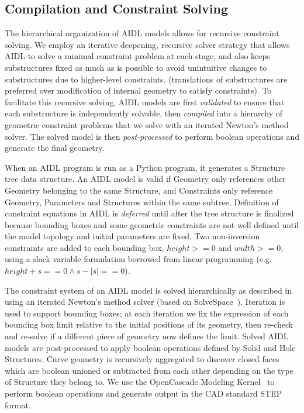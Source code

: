 \subsection{Compilation and Constraint Solving}
\label{sec:solver}


The hierarchical organization of AIDL models allows for recursive constraint solving. We employ an iterative deepening, recursive solver strategy that allows AIDL to solve a minimal constraint problem at each stage, and also keeps substructures fixed as much as is possible to avoid unintuitive changes to substructures due to higher-level constraints. (translations of substructures are preferred over modification of internal geometry to satisfy constraints). To facilitate this recursive solving, AIDL models are first \emph{validated} to ensure that each substructure is independently solvable, then \emph{compiled} into a hierarchy of geometric constraint problems that we solve with an iterated Newton's method solver. The solved model is then \emph{post-processed} to perform boolean operations and generate the final geometry.

When an AIDL program is run as a Python program, it generates a Structure tree data structure. An AIDL model is valid if Geometry only references other Geometry belonging to the same Structure, and Constraints only reference Geometry, Parameters and Structures within the same subtree. Definition of constraint equations in AIDL is \emph{deferred} until after the tree structure is finalized because bounding boxes and some geometric constraints are not well defined until the model topology and initial parameters are fixed. Two non-inversion constraints are added to each bounding box, $height >= 0$ and $width >= 0$, using a slack variable formulation borrowed from linear programming (e.g. $height + s == 0 \land s - |s| == 0$).

The constraint system of an AIDL model is solved hierarchically as described in  using an iterated Newton's method solver (based on SolveSpace~\cite{westhues_solvespace_2022}). Iteration is used to support bounding boxes; at each iteration we fix the expression of each bounding box limit relative to the initial positions of its geometry, then re-check and re-solve if a different piece of geometry now defines the limit. Solved AIDL models are post-processed to apply boolean operations defined by Solid and Hole Structures. Curve geometry is recursively aggregated to discover closed faces which are boolean unioned or subtracted from each other depending on the type of Structure they belong to. We use  the OpenCascade Modeling Kernel~\cite{occt3d_opencascade_2021} to perform boolean operations and generate output in the CAD standard STEP format.

